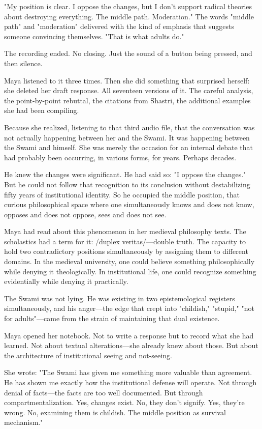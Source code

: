 \documentclass[12pt,twoside]{book}
\begin{document}
"My position is clear. I oppose the changes, but I don't support radical theories about destroying everything. The middle path. Moderation." The words "middle path" and "moderation" delivered with the kind of emphasis that suggests someone convincing themselves. "That is what adults do."

The recording ended. No closing. Just the sound of a button being pressed, and then silence.

Maya listened to it three times. Then she did something that surprised herself: she deleted her draft response. All seventeen versions of it. The careful analysis, the point-by-point rebuttal, the citations from Shastri, the additional examples she had been compiling.

Because she realized, listening to that third audio file, that the conversation was not actually happening between her and the Swami. It was happening between the Swami and himself. She was merely the occasion for an internal debate that had probably been occurring, in various forms, for years. Perhaps decades.

He knew the changes were significant. He had said so: "I oppose the changes." But he could not follow that recognition to its conclusion without destabilizing fifty years of institutional identity. So he occupied the middle position, that curious philosophical space where one simultaneously knows and does not know, opposes and does not oppose, sees and does not see.

Maya had read about this phenomenon in her medieval philosophy texts. The scholastics had a term for it: /duplex veritas/—double truth. The capacity to hold two contradictory positions simultaneously by assigning them to different domains. In the medieval university, one could believe something philosophically while denying it theologically. In institutional life, one could recognize something evidentially while denying it practically.

The Swami was not lying. He was existing in two epistemological registers simultaneously, and his anger—the edge that crept into "childish," "stupid," "not for adults"—came from the strain of maintaining that dual existence.

Maya opened her notebook. Not to write a response but to record what she had learned. Not about textual alterations—she already knew about those. But about the architecture of institutional seeing and not-seeing.

She wrote: "The Swami has given me something more valuable than agreement. He has shown me exactly how the institutional defense will operate. Not through denial of facts—the facts are too well documented. But through compartmentalization. Yes, changes exist. No, they don't signify. Yes, they're wrong. No, examining them is childish. The middle position as survival mechanism."
\end{document}
